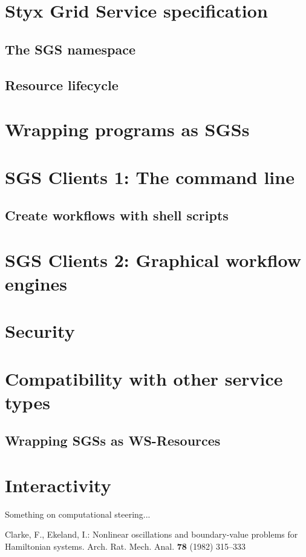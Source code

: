 \documentclass{llncs}
\begin{document}
\section{Styx Grid Service specification}
\subsection{The SGS namespace}
\subsection{Resource lifecycle}
%
\section{Wrapping programs as SGSs}
%
\section{SGS Clients 1: The command line}
\subsection{Create workflows with shell scripts}
%
\section{SGS Clients 2: Graphical workflow engines}
%
\section{Security}
%
\section{Compatibility with other service types}
\subsection{Wrapping SGSs as WS-Resources}
%
\section{Interactivity}
Something on computational steering...
%
%
\begin{thebibliography}{refs}
%
%
Clarke, F., Ekeland, I.:
Nonlinear oscillations and
boundary-value problems for Hamiltonian systems.
Arch. Rat. Mech. Anal. {\bf 78} (1982) 315--333

\end{thebibliography}
\end{document}
